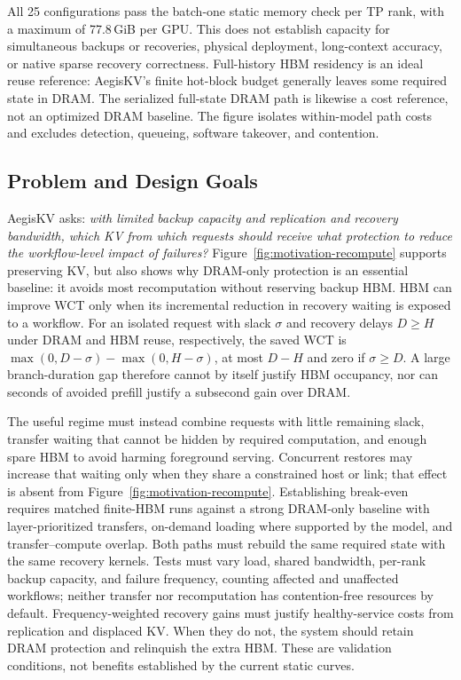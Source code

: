 All 25 configurations pass the batch-one static memory check per TP
rank, with a maximum of 77.8\,GiB per GPU. This does not establish capacity
for simultaneous backups or recoveries, physical deployment, long-context
accuracy, or native sparse recovery correctness.
Full-history HBM residency is an ideal reuse reference: AegisKV's finite
hot-block budget generally leaves some required state in DRAM.
The serialized full-state DRAM path is likewise a cost reference, not
an optimized DRAM baseline. The figure isolates within-model path costs
and excludes detection, queueing, software takeover, and contention.

\subsection{Problem and Design Goals}
\label{sec:motivation-goals}

AegisKV asks: \emph{with limited backup capacity and replication and
recovery bandwidth, which KV from which requests should receive what
protection to reduce the workflow-level impact of failures?}
Figure~\ref{fig:motivation-recompute} supports preserving KV, but also
shows why DRAM-only protection is an essential baseline: it avoids most
recomputation without reserving backup HBM. HBM can improve WCT only when
its incremental reduction in recovery waiting is exposed to a workflow.
For an isolated request with slack $\sigma$ and recovery delays
$D\geq H$ under DRAM and HBM reuse, respectively, the saved WCT is
$\max(0,D-\sigma)-\max(0,H-\sigma)$, at most $D-H$ and zero if
$\sigma\geq D$. A large branch-duration gap therefore cannot by itself
justify HBM occupancy, nor can seconds of avoided prefill justify a
subsecond gain over DRAM.

The useful regime must instead combine requests with little remaining
slack, transfer waiting that cannot be hidden by required computation,
and enough spare HBM to avoid harming foreground serving. Concurrent
restores may increase that waiting only when they share a constrained
host or link; that effect is absent from Figure~\ref{fig:motivation-recompute}.
Establishing break-even requires matched finite-HBM runs against a strong
DRAM-only baseline with layer-prioritized transfers, on-demand loading
where supported by the model, and transfer--compute overlap. Both paths
must rebuild the same required state with the same recovery kernels.
Tests must vary load, shared bandwidth, per-rank backup capacity, and
failure frequency, counting affected and unaffected workflows; neither
transfer nor recomputation has contention-free resources by default.
Frequency-weighted recovery gains
must justify healthy-service costs from replication and displaced KV.
When they do not, the system should retain DRAM protection and relinquish
the extra HBM. These are validation conditions, not benefits established
by the current static curves.

